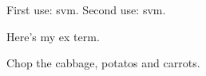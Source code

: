 \documentclass[english,ngerman,cdfont=no,cd=color]{tudscrartcl}
\begin{document}
First use: \gls{svm}. Second use: \gls{svm}.

Here’s my \gls{ex} term.

Chop the \gls{cabbage}, \glspl{potato} and \glspl{carrot}.

\printglossaries
\end{document}
